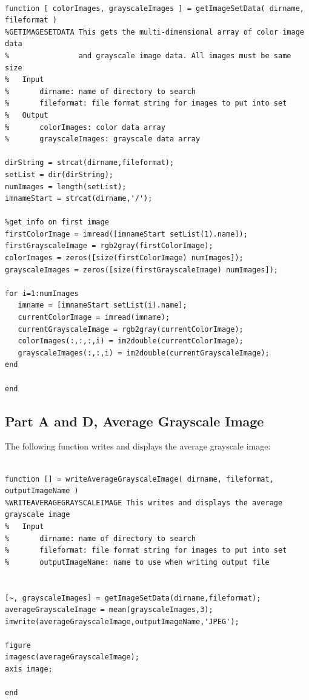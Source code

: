 \documentclass[11pt,psfig]{article}
\begin{document}
\begin{verbatim}

function [ colorImages, grayscaleImages ] = getImageSetData( dirname, fileformat )
%GETIMAGESETDATA This gets the multi-dimensional array of color image data
%                and grayscale image data. All images must be same size
%   Input
%       dirname: name of directory to search
%       fileformat: file format string for images to put into set
%   Output
%       colorImages: color data array
%       grayscaleImages: grayscale data array

dirString = strcat(dirname,fileformat);
setList = dir(dirString);
numImages = length(setList);
imnameStart = strcat(dirname,'/');

%get info on first image
firstColorImage = imread([imnameStart setList(1).name]);
firstGrayscaleImage = rgb2gray(firstColorImage);
colorImages = zeros([size(firstColorImage) numImages]);
grayscaleImages = zeros([size(firstGrayscaleImage) numImages]);

for i=1:numImages
   imname = [imnameStart setList(i).name];
   currentColorImage = imread(imname);
   currentGrayscaleImage = rgb2gray(currentColorImage);
   colorImages(:,:,:,i) = im2double(currentColorImage);
   grayscaleImages(:,:,i) = im2double(currentGrayscaleImage);
end

end

\end{verbatim}

\subsection*{Part A and D, Average Grayscale Image}

The following function writes and displays the average grayscale image:

\begin{verbatim}

function [] = writeAverageGrayscaleImage( dirname, fileformat, outputImageName )
%WRITEAVERAGEGRAYSCALEIMAGE This writes and displays the average grayscale image
%   Input
%       dirname: name of directory to search
%       fileformat: file format string for images to put into set
%       outputImageName: name to use when writing output file


[~, grayscaleImages] = getImageSetData(dirname,fileformat);
averageGrayscaleImage = mean(grayscaleImages,3);
imwrite(averageGrayscaleImage,outputImageName,'JPEG');

figure
imagesc(averageGrayscaleImage);
axis image;

end

\end{verbatim}
\end{document}
